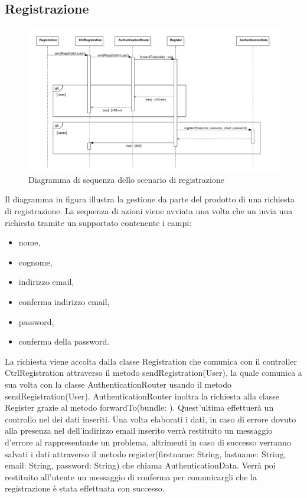 \documentclass[a4paper, titlepage]{article}
\begin{document}
\newpage
\subsection{Registrazione}
\begin{figure}[!h]
	\centering
	\includegraphics[scale=0.5]{Img/seq-register.pdf}
	\caption{Diagramma di sequenza dello scenario di registrazione}
\end{figure}
Il diagramma in figura illustra la gestione da parte del prodotto di una richiesta di registrazione. La sequenza di azioni viene avviata una volta che un  invia una richiesta tramite un   supportato contenente i campi: 
\begin{itemize}
	\item nome,
	\item cognome,
	\item indirizzo email,
	\item conferma indirizzo email,
	\item password,
	\item conferma della password.
\end{itemize}
La richiesta viene accolta dalla classe Registration che comunica con il controller CtrlRegistration attraverso il metodo sendRegistration(User), la quale comunica a sua volta con la classe AuthenticationRouter usando il metodo sendRegistration(User).
AuthenticationRouter inoltra la richiesta alla classe Register grazie al metodo forwardTo(bundle: ). Quest'ultima effettuerà un controllo nel  dei dati inseriti. Una volta elaborati i dati, in caso di errore dovuto alla presenza nel  dell'indirizzo email inserito verrà restituito un messaggio d'errore al  rappresentante un problema, altrimenti in caso di successo verranno salvati i dati attraverso il metodo register(firstname: String, lastname: String, email: String, password: String) che chiama AuthenticationData. Verrà poi restituito all'utente un messaggio di conferma per comunicargli che la registrazione è stata effettuata con successo.
\end{document}
